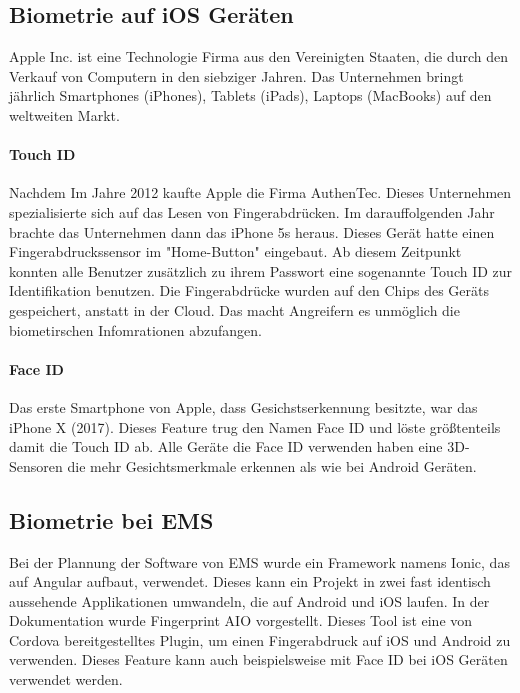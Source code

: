 \subsection{Biometrie auf iOS Geräten}
Apple Inc. ist eine Technologie Firma aus den Vereinigten Staaten, die durch den Verkauf von Computern in den siebziger Jahren. Das Unternehmen bringt jährlich Smartphones (iPhones), Tablets (iPads), Laptops (MacBooks) auf den weltweiten Markt.
\paragraph{Touch ID}
Nachdem 
Im Jahre 2012 kaufte Apple die Firma AuthenTec. Dieses Unternehmen spezialisierte sich auf das Lesen von Fingerabdrücken.
Im darauffolgenden Jahr brachte das Unternehmen dann das iPhone 5s heraus. Dieses Gerät hatte einen Fingerabdruckssensor im "Home-Button" eingebaut. Ab diesem Zeitpunkt konnten alle Benutzer zusätzlich zu ihrem Passwort eine sogenannte Touch ID zur Identifikation benutzen.
Die Fingerabdrücke wurden auf den Chips des Geräts gespeichert, anstatt in der Cloud. Das macht Angreifern es unmöglich die biometirschen Infomrationen abzufangen.
\paragraph{Face ID}
Das erste Smartphone von Apple, dass Gesichstserkennung besitzte, war das iPhone X (2017). Dieses Feature trug den Namen Face ID und löste größtenteils damit die Touch ID ab.
Alle Geräte die Face ID verwenden haben eine 3D-Sensoren die mehr Gesichtsmerkmale erkennen als wie bei Android Geräten.


\subsection{Biometrie bei EMS}
Bei der Plannung der Software von EMS wurde ein Framework namens Ionic, das auf Angular aufbaut, verwendet. Dieses kann ein Projekt in zwei fast identisch aussehende Applikationen umwandeln, die auf Android und iOS laufen.
In der Dokumentation wurde Fingerprint AIO vorgestellt. Dieses Tool ist eine von Cordova bereitgestelltes Plugin, um einen Fingerabdruck auf iOS und Android zu verwenden.
Dieses Feature kann auch beispielsweise mit Face ID bei iOS Geräten verwendet werden.


